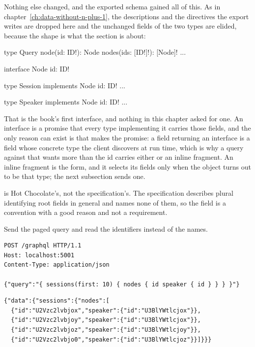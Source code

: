 %
Nothing else changed, and the exported schema gained all of this. As in
chapter~\ref{ch:data-without-n-plus-1}, the descriptions and the 
directives the export writes are dropped here and the unchanged fields of the
two types are elided, because the shape is what the section is about:

\begin{graphqlsdl}
type Query {
  node(id: ID!): Node
  nodes(ids: [ID!]!): [Node]!
  ...
}

interface Node {
  id: ID!
}

type Session implements Node {
  id: ID!
  ...
}

type Speaker implements Node {
  id: ID!
  ...
}
\end{graphqlsdl}

%
%
That is the book's first interface, and nothing in this chapter asked for one.
An interface is a promise that every type implementing it carries those
fields, and the only reason  can exist is that  makes
the promise: a field returning an interface is a field whose concrete type the
client discovers at run time, which is why a query against  that
wants more than the id carries either  or an inline
fragment. An inline fragment is the  form,
and it selects its fields only when the object turns out to be that type; the
next subsection sends one.

%
 is Hot Chocolate's, not the specification's. The specification
describes plural identifying root fields in general and names none of them, so
the field is a convention with a good reason and not a requirement.

%
Send the paged query and read the identifiers instead of the names.

\begin{verbatim}
POST /graphql HTTP/1.1
Host: localhost:5001
Content-Type: application/json

{"query":"{ sessions(first: 10) { nodes { id speaker { id } } } }"}
\end{verbatim}

\begin{verbatim}
{"data":{"sessions":{"nodes":[
  {"id":"U2Vzc2lvbjox","speaker":{"id":"U3BlYWtlcjox"}},
  {"id":"U2Vzc2lvbjoy","speaker":{"id":"U3BlYWtlcjox"}},
  {"id":"U2Vzc2lvbjoz","speaker":{"id":"U3BlYWtlcjoy"}},
  {"id":"U2Vzc2lvbjo0","speaker":{"id":"U3BlYWtlcjoz"}}]}}}
\end{verbatim}


